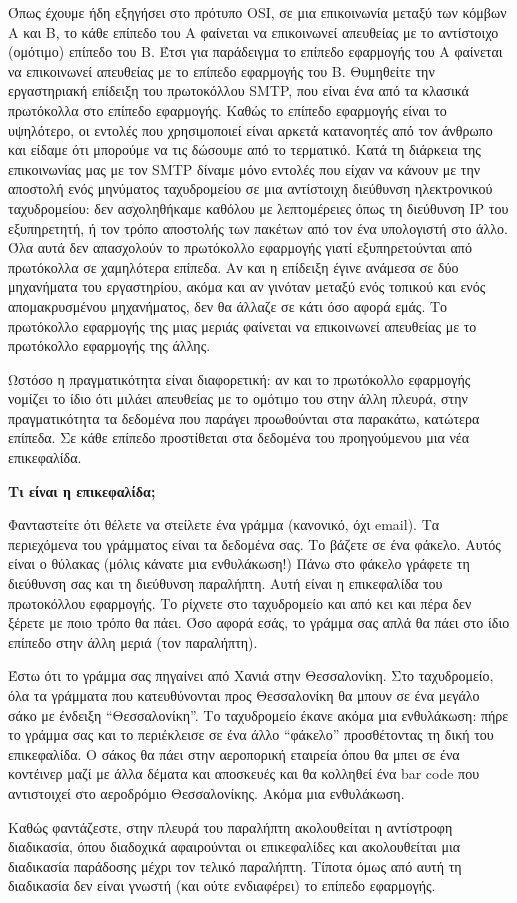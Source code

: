 Όπως έχουμε ήδη εξηγήσει στο πρότυπο OSI, σε μια επικοινωνία μεταξύ των κόμβων Α και Β, το κάθε επίπεδο του Α φαίνεται να επικοινωνεί απευθείας με το αντίστοιχο (ομότιμο) επίπεδο του Β. Έτσι για παράδειγμα το επίπεδο εφαρμογής του Α φαίνεται να επικοινωνεί απευθείας με το επίπεδο εφαρμογής του Β. Θυμηθείτε την εργαστηριακή επίδειξη του πρωτοκόλλου SMTP, που είναι ένα από τα κλασικά πρωτόκολλα στο επίπεδο εφαρμογής. Καθώς το επίπεδο εφαρμογής είναι το υψηλότερο, οι εντολές που χρησιμοποιεί είναι αρκετά κατανοητές από τον άνθρωπο και είδαμε ότι μπορούμε να τις δώσουμε από το τερματικό. Κατά τη διάρκεια της επικοινωνίας μας με τον SMTP δίναμε μόνο εντολές που είχαν να κάνουν με την αποστολή ενός μηνύματος ταχυδρομείου σε μια αντίστοιχη διεύθυνση ηλεκτρονικού ταχυδρομείου: δεν ασχοληθήκαμε καθόλου με λεπτομέρειες όπως τη διεύθυνση IP του εξυπηρετητή, ή τον τρόπο αποστολής των πακέτων από τον ένα υπολογιστή στο άλλο. Όλα αυτά δεν απασχολούν το πρωτόκολλο εφαρμογής γιατί εξυπηρετούνται από πρωτόκολλα σε χαμηλότερα επίπεδα. Αν και η επίδειξη έγινε ανάμεσα σε δύο μηχανήματα του εργαστηρίου, ακόμα και αν γινόταν μεταξύ ενός τοπικού και ενός απομακρυσμένου μηχανήματος, δεν θα άλλαζε σε κάτι όσο αφορά εμάς. Το πρωτόκολλο εφαρμογής της μιας μεριάς φαίνεται να επικοινωνεί απευθείας με το πρωτόκολλο εφαρμογής της άλλης.

Ωστόσο η πραγματικότητα είναι διαφορετική: αν και το πρωτόκολλο εφαρμογής νομίζει το ίδιο ότι μιλάει απευθείας με το ομότιμο του στην άλλη πλευρά, στην πραγματικότητα τα δεδομένα που παράγει προωθούνται στα παρακάτω, κατώτερα επίπεδα. Σε κάθε επίπεδο προστίθεται στα δεδομένα του προηγούμενου μια νέα επικεφαλίδα.

\begin{inthebox}
\textbf{Τι είναι η επικεφαλίδα;}

Φανταστείτε ότι θέλετε να στείλετε ένα γράμμα (κανονικό, όχι email). Τα περιεχόμενα του γράμματος είναι τα δεδομένα σας. Το βάζετε σε ένα φάκελο. Αυτός είναι ο θύλακας (μόλις κάνατε μια ενθυλάκωση!) Πάνω στο φάκελο γράφετε τη διεύθυνση σας και τη διεύθυνση παραλήπτη. Αυτή είναι η επικεφαλίδα του πρωτοκόλλου εφαρμογής. Το ρίχνετε στο ταχυδρομείο και από κει και πέρα δεν ξέρετε με ποιο τρόπο θα πάει. Όσο αφορά εσάς, το γράμμα σας απλά θα πάει στο ίδιο επίπεδο στην άλλη μεριά (τον παραλήπτη).

Έστω ότι το γράμμα σας πηγαίνει από Χανιά στην Θεσσαλονίκη. Στο ταχυδρομείο, όλα τα γράμματα που κατευθύνονται προς Θεσσαλονίκη θα μπουν σε ένα μεγάλο σάκο με ένδειξη ``Θεσσαλονίκη''. Το ταχυδρομείο έκανε ακόμα μια ενθυλάκωση: πήρε το γράμμα σας και το περιέκλεισε σε ένα άλλο ``φάκελο'' προσθέτοντας τη δική του επικεφαλίδα. Ο σάκος θα πάει στην αεροπορική εταιρεία όπου θα μπει σε ένα κοντέινερ μαζί με άλλα δέματα και αποσκευές και θα κολληθεί ένα bar code που αντιστοιχεί στο αεροδρόμιο Θεσσαλονίκης. Ακόμα μια ενθυλάκωση.

Καθώς φαντάζεστε, στην πλευρά του παραλήπτη ακολουθείται η αντίστροφη διαδικασία, όπου διαδοχικά αφαιρούνται οι επικεφαλίδες και ακολουθείται μια διαδικασία παράδοσης μέχρι τον τελικό παραλήπτη. Τίποτα όμως από αυτή τη διαδικασία δεν είναι γνωστή (και ούτε ενδιαφέρει) το επίπεδο εφαρμογής.\\
\end{inthebox}

